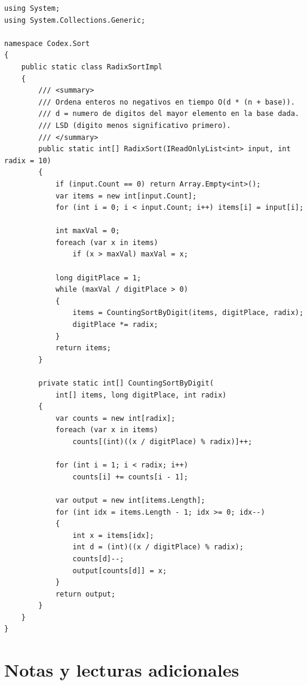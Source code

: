 \documentclass[11pt,a4paper]{article}
\begin{document}
\begin{lstlisting}[caption={\texttt{RadixSort.cs} --- ordenamiento por base (LSD)}]
using System;
using System.Collections.Generic;

namespace Codex.Sort
{
    public static class RadixSortImpl
    {
        /// <summary>
        /// Ordena enteros no negativos en tiempo O(d * (n + base)).
        /// d = numero de digitos del mayor elemento en la base dada.
        /// LSD (digito menos significativo primero).
        /// </summary>
        public static int[] RadixSort(IReadOnlyList<int> input, int radix = 10)
        {
            if (input.Count == 0) return Array.Empty<int>();
            var items = new int[input.Count];
            for (int i = 0; i < input.Count; i++) items[i] = input[i];

            int maxVal = 0;
            foreach (var x in items)
                if (x > maxVal) maxVal = x;

            long digitPlace = 1;
            while (maxVal / digitPlace > 0)
            {
                items = CountingSortByDigit(items, digitPlace, radix);
                digitPlace *= radix;
            }
            return items;
        }

        private static int[] CountingSortByDigit(
            int[] items, long digitPlace, int radix)
        {
            var counts = new int[radix];
            foreach (var x in items)
                counts[(int)((x / digitPlace) % radix)]++;

            for (int i = 1; i < radix; i++)
                counts[i] += counts[i - 1];

            var output = new int[items.Length];
            for (int idx = items.Length - 1; idx >= 0; idx--)
            {
                int x = items[idx];
                int d = (int)((x / digitPlace) % radix);
                counts[d]--;
                output[counts[d]] = x;
            }
            return output;
        }
    }
}
\end{lstlisting}

\section{Notas y lecturas adicionales}
\end{document}
